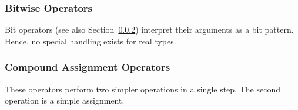 \subsubsection{Bitwise Operators}
Bit operators (see also Section~\ref{sec:compoundAssignOp}) interpret their
arguments as a bit pattern.  Hence, no special handling exists for
real types. 

\begin{functionality}
\cxxOp
\end{functionality}
\begin{functionality}
\cxxOp
\end{functionality}
\begin{functionality}
\cxxOp
\end{functionality}
\begin{functionality}
\cxxOp
\end{functionality}
\begin{functionality}
\cxxOp
\end{functionality}
\begin{functionality}
\cxxOp
\end{functionality}

\subsubsection{Compound Assignment Operators}\label{sec:compoundAssignOp}
These operators perform two simpler operations in a single step.  The
second operation is a simple assignment.  

